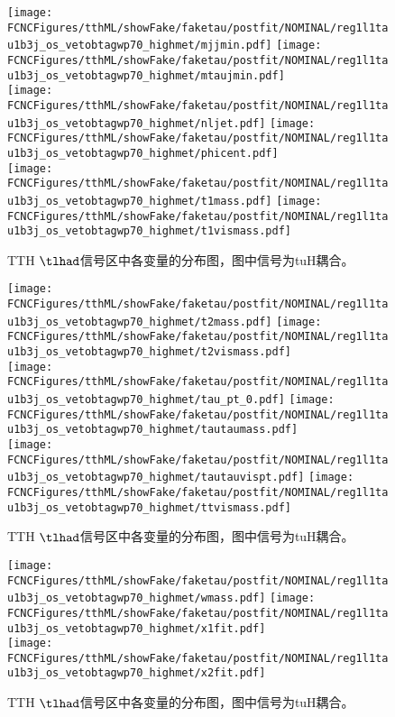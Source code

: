 \begin{figure}[H]
\centering
\texttt{[image: \\FCNCFigures/tthML/showFake/faketau/postfit/NOMINAL/reg1l1tau1b3j\_os\_vetobtagwp70\_highmet/mjjmin.pdf]}
\texttt{[image: \\FCNCFigures/tthML/showFake/faketau/postfit/NOMINAL/reg1l1tau1b3j\_os\_vetobtagwp70\_highmet/mtaujmin.pdf]}
\\
\texttt{[image: \\FCNCFigures/tthML/showFake/faketau/postfit/NOMINAL/reg1l1tau1b3j\_os\_vetobtagwp70\_highmet/nljet.pdf]}
\texttt{[image: \\FCNCFigures/tthML/showFake/faketau/postfit/NOMINAL/reg1l1tau1b3j\_os\_vetobtagwp70\_highmet/phicent.pdf]}
\\
\texttt{[image: \\FCNCFigures/tthML/showFake/faketau/postfit/NOMINAL/reg1l1tau1b3j\_os\_vetobtagwp70\_highmet/t1mass.pdf]}
\texttt{[image: \\FCNCFigures/tthML/showFake/faketau/postfit/NOMINAL/reg1l1tau1b3j\_os\_vetobtagwp70\_highmet/t1vismass.pdf]}
\\
\caption{TTH $\tlhad$信号区中各变量的分布图，图中信号为tuH耦合。}
\label{fig:var_reg1l1tau1b3j_os_vetobtagwp70_highmet_1}
\end{figure}
\begin{figure}[H]
\centering
\texttt{[image: \\FCNCFigures/tthML/showFake/faketau/postfit/NOMINAL/reg1l1tau1b3j\_os\_vetobtagwp70\_highmet/t2mass.pdf]}
\texttt{[image: \\FCNCFigures/tthML/showFake/faketau/postfit/NOMINAL/reg1l1tau1b3j\_os\_vetobtagwp70\_highmet/t2vismass.pdf]}
\\
\texttt{[image: \\FCNCFigures/tthML/showFake/faketau/postfit/NOMINAL/reg1l1tau1b3j\_os\_vetobtagwp70\_highmet/tau\_pt\_0.pdf]}
\texttt{[image: \\FCNCFigures/tthML/showFake/faketau/postfit/NOMINAL/reg1l1tau1b3j\_os\_vetobtagwp70\_highmet/tautaumass.pdf]}
\\
\texttt{[image: \\FCNCFigures/tthML/showFake/faketau/postfit/NOMINAL/reg1l1tau1b3j\_os\_vetobtagwp70\_highmet/tautauvispt.pdf]}
\texttt{[image: \\FCNCFigures/tthML/showFake/faketau/postfit/NOMINAL/reg1l1tau1b3j\_os\_vetobtagwp70\_highmet/ttvismass.pdf]}
\\
\caption{TTH $\tlhad$信号区中各变量的分布图，图中信号为tuH耦合。}
\label{fig:var_reg1l1tau1b3j_os_vetobtagwp70_highmet_2}
\end{figure}
\begin{figure}[H]
\centering
\texttt{[image: \\FCNCFigures/tthML/showFake/faketau/postfit/NOMINAL/reg1l1tau1b3j\_os\_vetobtagwp70\_highmet/wmass.pdf]}
\texttt{[image: \\FCNCFigures/tthML/showFake/faketau/postfit/NOMINAL/reg1l1tau1b3j\_os\_vetobtagwp70\_highmet/x1fit.pdf]}
\\
\texttt{[image: \\FCNCFigures/tthML/showFake/faketau/postfit/NOMINAL/reg1l1tau1b3j\_os\_vetobtagwp70\_highmet/x2fit.pdf]}
\caption{TTH $\tlhad$信号区中各变量的分布图，图中信号为tuH耦合。}
\label{fig:var_reg1l1tau1b3j_os_vetobtagwp70_highmet}
\end{figure}
